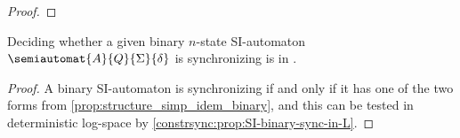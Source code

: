 \begin{proof}
\end{proof}

\begin{proposition} \label{constrsync:prop2:SI-binary-sync-in-L}
	Deciding whether a given binary $n$-state SI-automaton $\semiautomat{A}{Q}{\Sigma}{\delta}$ is synchronizing
	is in \LOGSPACE. 
\end{proposition}
\begin{proof}
	A binary SI-automaton is synchronizing
	if and only if it has one of the two forms
	from \cref{prop:structure_simp_idem_binary}, 
	and this can be tested in deterministic log-space
	by \cref{constrsync:prop:SI-binary-sync-in-L}.
\end{proof}

